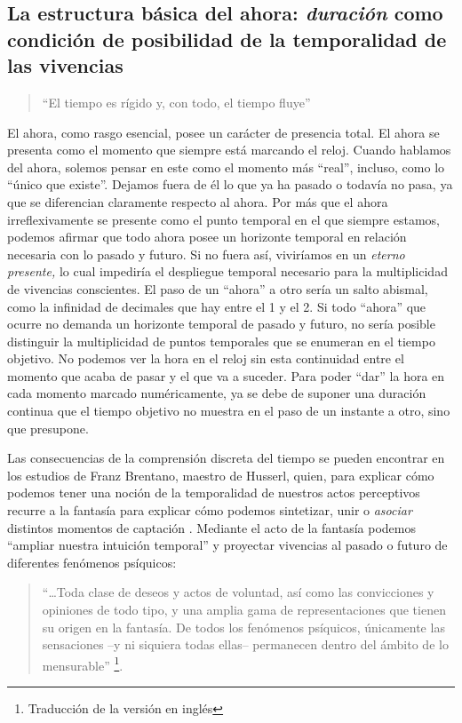 \subsection{La estructura básica del ahora: \textit{duración} como condición de posibilidad de la temporalidad de las vivencias}\label{sec:estructura-ahora}

\begin{quote}
``El tiempo es rígido y, con todo, el tiempo fluye''
\end{quote}

\cite[§31, p.~84]{husserl2002}

El ahora, como rasgo esencial, posee un carácter de presencia total. El
ahora se presenta como el momento que siempre está marcando el reloj.
Cuando hablamos del ahora, solemos pensar en este como el momento más
``real'', incluso, como lo ``único que existe''. Dejamos fuera de él lo
que ya ha pasado o todavía no pasa, ya que se diferencian claramente
respecto al ahora. Por más que el ahora irreflexivamente se presente
como el punto temporal en el que siempre estamos, podemos afirmar que
todo ahora posee un horizonte temporal en relación necesaria con lo
pasado y futuro. Si no fuera así, viviríamos en un \emph{eterno
presente,} lo cual impediría el despliegue temporal necesario para la
multiplicidad de vivencias conscientes. El paso de un ``ahora'' a otro
sería un salto abismal, como la infinidad de decimales que hay entre el
1 y el 2. Si todo ``ahora'' que ocurre no demanda un horizonte temporal
de pasado y futuro, no sería posible distinguir la multiplicidad de
puntos temporales que se enumeran en el tiempo objetivo. No podemos ver
la hora en el reloj sin esta continuidad entre el momento que acaba de
pasar y el que va a suceder. Para poder ``dar'' la hora en cada momento
marcado numéricamente, ya se debe de suponer una duración continua que
el tiempo objetivo no muestra en el paso de un instante a otro, sino que
presupone.

Las consecuencias de la comprensión discreta del tiempo se pueden
encontrar en los estudios de Franz Brentano, maestro de Husserl, quien,
para explicar cómo podemos tener una noción de la temporalidad de
nuestros actos perceptivos recurre a la fantasía para explicar cómo
podemos sintetizar, unir o \emph{asociar} distintos momentos de
captación \cite[p.~54]{mensch2010}. Mediante el acto de la fantasía podemos
``ampliar nuestra intuición temporal'' y proyectar vivencias al pasado o
futuro de diferentes fenómenos psíquicos:

\begin{quote}
``\ldots Toda clase de deseos y actos de voluntad, así como las
convicciones y opiniones de todo tipo, y una amplia gama de
representaciones que tienen su origen en la fantasía. De todos los
fenómenos psíquicos, únicamente las sensaciones --y ni siquiera todas
ellas-- permanecen dentro del ámbito de lo mensurable'' \cite[p.~52]{brentano2009}\footnote{Traducción de la versión en inglés}.
\end{quote}

